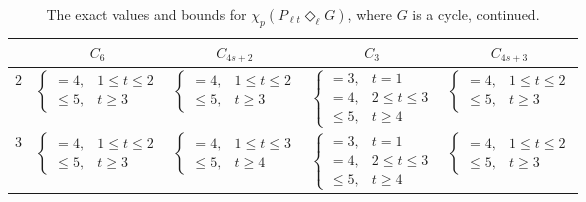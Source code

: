 \documentclass{article}
\begin{document}
\begin{table}[htb]
\begin{center}
\caption{The exact values and bounds for $\chi_p(P_{\ell t} \Diamond_{\ell} G)$, where $G$ is a cycle, continued.}\label{tabela3}

\vspace{3mm}
{\tabulinesep=1mm
\begin{tabu}{|c|*{4}{c|}}\hline
{}  & $C_6$ & $C_{4s+2}$ & $C_3$ & $C_{4s+3}$\\ \hline

$2$ & $\left\{
\begin{array}{ll}
 = 4, & 1 \leq t \leq 2\\
\leq 5, & t \geq 3
\end{array}\right.$ & $\left\{
\begin{array}{ll}
 = 4, & 1 \leq t \leq 2\\
\leq 5, & t \geq 3
\end{array}\right.$ & $\left\{
\begin{array}{ll}
= 3, & t=1\\
= 4, & 2 \leq t \leq 3\\
\leq 5, & t\geq 4
\end{array}\right.$ & $\left\{
\begin{array}{ll}
= 4, & 1 \leq t \leq 2\\
\leq 5, & t\geq 3
\end{array}\right.$ \\ \hline

$3$ & $\left\{
\begin{array}{ll}
= 4, & 1 \leq t \leq 2\\
\leq 5, & t \geq 3
\end{array}\right.$ & $\left\{
\begin{array}{ll}
= 4, & 1 \leq t \leq 3\\
\leq 5, & t \geq 4
\end{array}\right.$ & $\left\{
\begin{array}{ll}
= 3, & t =1\\
= 4, & 2 \leq t\leq 3\\
\leq 5, & t \geq 4
\end{array}\right.$ & $\left\{
\begin{array}{ll}
= 4, & 1 \leq t \leq 2\\
\leq 5, & t\geq 3
\end{array}\right.$ \\ \hline

\end{tabu}}
\vspace{3mm}
\end{center}
\end{table}
\end{document}
